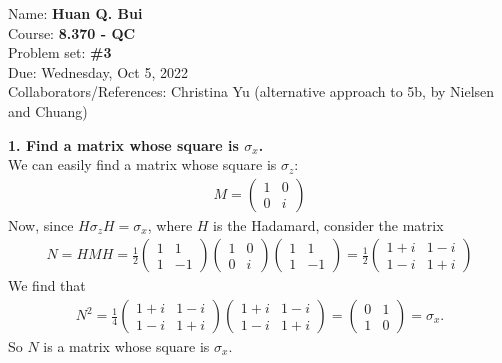 \documentclass{article}
\theoremstyle{definition}
\newcommand{\f}[2]{\frac{#1}{#2}}
\begin{document}
\begin{framed}
\noindent Name: \textbf{Huan Q. Bui}\\
Course: \textbf{8.370 - QC}\\
Problem set: \textbf{\#3}\\
Due: Wednesday, Oct 5, 2022\\
Collaborators/References: Christina Yu (alternative approach to 5b, by Nielsen and Chuang)
\end{framed}

\noindent \textbf{1. Find a matrix whose square is $\sigma_x$.}\\

\noindent We can easily find a matrix whose square is $\sigma_z$:
\begin{align*}
	M = \begin{pmatrix}
		1 & 0 \\ 0 & i
	\end{pmatrix}
\end{align*}
Now, since $H \sigma_z H = \sigma_x$, where $H$ is the Hadamard, consider the matrix
\begin{align*}
	N = HMH = \f{1}{2}\begin{pmatrix}
		1 & 1 \\ 1 & -1
	\end{pmatrix}
	\begin{pmatrix}
		1 & 0 \\ 0 & i
	\end{pmatrix}
	\begin{pmatrix}
		1 & 1 \\ 1 & -1
	\end{pmatrix}
	= \f{1}{2}
	\begin{pmatrix}
		1 + i & 1 - i \\ 1 -i & 1 + i
	\end{pmatrix}
\end{align*}
We find that
\begin{align*}
	N^2 = \f{1}{4}
	\begin{pmatrix}
		1 + i & 1 - i \\ 1 -i & 1 + i
	\end{pmatrix} 
\begin{pmatrix}
1 + i & 1 - i \\ 1 -i & 1 + i
\end{pmatrix} = \begin{pmatrix}
0 & 1 \\ 1 & 0 
\end{pmatrix} = \sigma_x.
\end{align*}
So $N$ is a matrix whose square is $\sigma_x$.\\
\end{document}
